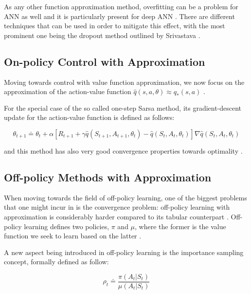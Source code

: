\documentclass{seal_thesis}
\begin{document}
As any other function approximation method, overfitting can be a problem for ANN as well and it is particularly present for deep ANN \cite[p. 218]{Sutton2017}. There are different techniques that can be used in order to mitigate this effect, with the most prominent one being the dropout method outlined by Srivastava \cite{Srivastava2014}.

\subsection{On-policy Control with Approximation}
\label{subsec:onpol_control}

Moving towards control with value function approximation, we now focus on the approximation of the action-value function $\hat{q} (s,a,\theta) \approx q_* (s,a)$ \cite[p. 229]{Sutton2017}.

For the special case of the so called one-step Sarsa method, its gradient-descent update for the action-value function is defined as follows:

\begin{equation}
	\theta_{t+1} \doteq \theta_t + \alpha [ R_{t+1} + \gamma \hat{q} (S_{t+1}, A_{t+1}, \theta_t) - \hat{q} (S_t, A_t, \theta_t) ] \nabla \hat{q} (S_t, A_t, \theta_t)
\end{equation}

and this method has also very good convergence properties towards optimality \cite[p. 230]{Sutton2017}.

\subsection{Off-policy Methods with Approximation}
\label{subsec:offpol_methods}

When moving towards the field of off-policy learning, one of the biggest problems that one might incur in is the convergence problem: off-policy learning with approximation is considerably harder compared to its tabular counterpart \cite[p. 243]{Sutton2017}. Off-policy learning defines two policies, $\pi$ and $\mu$, where the former is the value function we seek to learn based on the latter \cite[p. 243]{Sutton2017}.

A new aspect being introduced in off-policy learning is the importance sampling concept, formally defined as follow:

\begin{equation}
\label{eq:importance_sampling}
	\rho_t \doteq \frac{\pi(A_t|S_t)}{\mu(A_t|S_t)}
\end{equation}
\end{document}
